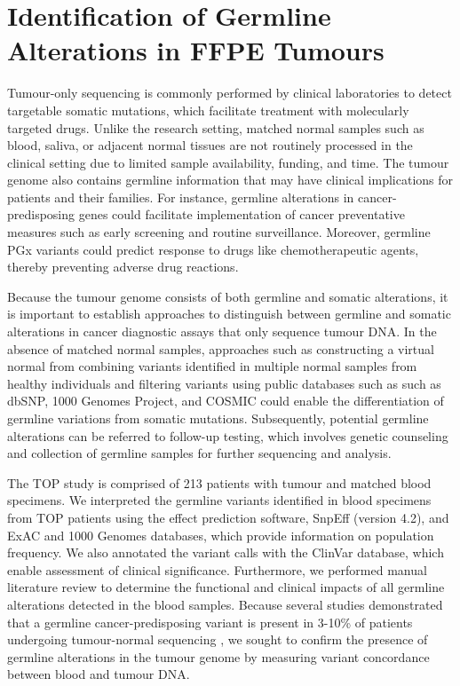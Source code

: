 
\chapter{Identification of Germline Alterations in FFPE Tumours}
\label{ch:IdentificationofGermlineAlterationsinFFPETumours}

Tumour-only sequencing is commonly performed by clinical laboratories to detect targetable somatic mutations, which facilitate treatment with molecularly targeted drugs. Unlike the research setting, matched normal samples such as blood, saliva, or adjacent normal tissues are not routinely processed in the clinical setting due to limited sample availability, funding, and time. The tumour genome also contains germline information that may have clinical implications for patients and their families. For instance, germline alterations in cancer-predisposing genes could facilitate implementation of cancer preventative measures such as early screening and routine surveillance. Moreover, germline PGx variants could predict response to drugs like chemotherapeutic agents, thereby preventing adverse drug reactions.

Because the tumour genome consists of both germline and somatic alterations, it is important to establish approaches to distinguish between germline and somatic alterations in cancer diagnostic assays that only sequence tumour DNA. In the absence of matched normal samples, approaches such as constructing a virtual normal from combining variants identified in multiple normal samples from healthy individuals and filtering variants using public databases such as such as dbSNP, 1000 Genomes Project, and COSMIC could enable the differentiation of germline variations from somatic mutations. Subsequently, potential germline alterations can be referred to follow-up testing, which involves genetic counseling and collection of germline samples for further sequencing and analysis.

The TOP study is comprised of 213 patients with tumour and matched blood specimens. We interpreted the germline variants identified in blood specimens from TOP patients using the effect prediction software, SnpEff (version 4.2), and ExAC and 1000 Genomes databases, which provide information on population frequency. We also annotated the variant calls with the ClinVar database, which enable assessment of clinical significance. Furthermore, we performed manual literature review to determine the functional and clinical impacts of all germline alterations detected in the blood samples. Because several studies demonstrated that a germline cancer-predisposing variant is present in 3-10\% of patients undergoing tumour-normal sequencing \cite{Raymond2016,Meric-Bernstam2016,Schrader2015,Jones2015}, we sought to confirm the presence of germline alterations in the tumour genome by measuring variant concordance between blood and tumour DNA.

